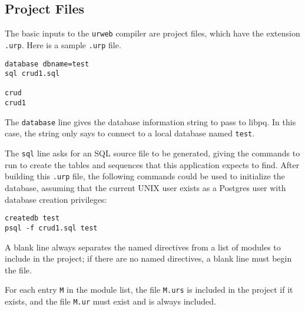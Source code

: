 \documentclass{article}
\begin{document}
\subsection{Project Files}

The basic inputs to the \texttt{urweb} compiler are project files, which have the extension \texttt{.urp}.  Here is a sample \texttt{.urp} file.

\begin{verbatim}
database dbname=test
sql crud1.sql

crud
crud1
\end{verbatim}

The \texttt{database} line gives the database information string to pass to libpq.  In this case, the string only says to connect to a local database named \texttt{test}.

The \texttt{sql} line asks for an SQL source file to be generated, giving the commands to run to create the tables and sequences that this application expects to find.  After building this \texttt{.urp} file, the following commands could be used to initialize the database, assuming that the current UNIX user exists as a Postgres user with database creation privileges:

\begin{verbatim}
createdb test
psql -f crud1.sql test
\end{verbatim}

A blank line always separates the named directives from a list of modules to include in the project; if there are no named directives, a blank line must begin the file.

For each entry \texttt{M} in the module list, the file \texttt{M.urs} is included in the project if it exists, and the file \texttt{M.ur} must exist and is always included.
\end{document}
